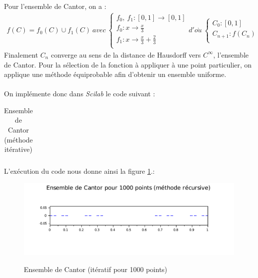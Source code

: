 \documentclass[a4paper,10pt]{report}
\begin{document}
Pour l'ensemble de Cantor, on a :\\
\begin{equation}
\begin{array}{l}
f(C)=f_0(C)\cup f_1(C) \ avec \
\left\lbrace
\begin{array}{l}
f_0,\ f_1 : [0,1] \longrightarrow [0,1] \\
f_0 : x \longrightarrow \frac{x}{3}\\
f_1 : x \longrightarrow \frac{x}{3}+\frac{2}{3}\\
\end{array}\right.
d'o\grave{u} \
\left\lbrace
\begin{array}{l}
C_0 : [0,1]\\
C_{n+1} : f(C_n)\\
\end{array}\right.
\end{array}
\end{equation}
Finalement $C_n$ converge au sens de la distance de Hausdorff vers $C^\infty$, l'ensemble de Cantor. Pour la sélection de la fonction à appliquer à une point particulier, on applique une méthode équiprobable afin d'obtenir un ensemble uniforme.\\ \\
\indent On implémente donc dans \textit{Scilab} le code suivant :
\begin{table}[H]
\caption{Ensemble de Cantor (méthode itérative)}
\begin{tabular}{l}
\\
\end{tabular}
\end{table}
L'exécution du code nous donne ainsi la figure \ref{cantor_iteratif}.:
\begin{center}
\begin{figure}[H]
\caption{Ensemble de Cantor (itératif pour 1000 points)}
\includegraphics[width=\textwidth]{cantor_iteratif.pdf}
\label{cantor_iteratif}
\end{figure}
\end{center}
\end{document}
